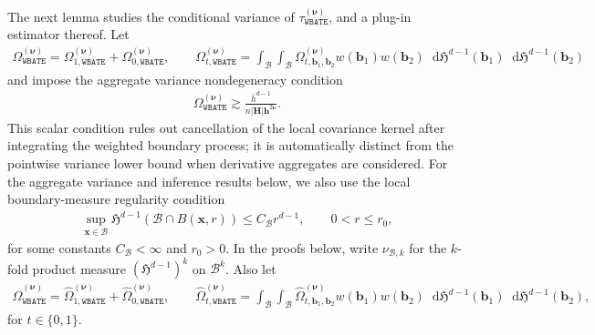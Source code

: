\documentclass[10pt]{article}
\newcommand{\Haus}{\mathfrak{H}}
\newcommand{\dif}{\mathop{}\!\mathrm{d}}
\newcommand{\bb}{\mathbf{b}}
\newcommand{\bh}{\mathbf{h}}
\newcommand{\bH}{\mathbf{H}}
\newcommand{\bx}{\mathbf{x}}
\newcommand{\bnu}{\boldsymbol{\nu}}
\newcommand{\B}{\mathcal{B}}
\begin{document}
The next lemma studies the conditional variance of $\tau_{\mathtt{WBATE}}^{(\bnu)}$, and a plug-in estimator thereof. Let
\begin{align*}
    \Omega_{\mathtt{WBATE}}^{(\bnu)} = \Omega_{1,\mathtt{WBATE}}^{(\bnu)} + \Omega_{0,\mathtt{WBATE}}^{(\bnu)},
    \qquad
    \Omega_{t,\mathtt{WBATE}}^{(\bnu)} = \int_{\B} \int_{\B} \Omega^{(\bnu)}_{t,\bb_1,\bb_2} w(\bb_1) w(\bb_2) \dif\Haus^{d-1}(\bb_1) \dif\Haus^{d-1}(\bb_2)
\end{align*}
and impose the aggregate variance nondegeneracy condition
\begin{align}
    \Omega_{\mathtt{WBATE}}^{(\bnu)}
    \gtrsim \frac{\bar{h}^{d-1}}{n|\bH|\bh^{2\bnu}}.
    \label{sa-eq: sharp WBATE aggregate nondegeneracy}
\end{align}
This scalar condition rules out cancellation of the local covariance kernel after integrating the weighted boundary process; it is automatically distinct from the pointwise variance lower bound when derivative aggregates are considered.
For the aggregate variance and inference results below, we also use the local boundary-measure regularity condition
\begin{align}
    \sup_{\bx\in\B}\Haus^{d-1}(\B\cap B(\bx,r)) \leq C_{\B}r^{d-1},
    \qquad 0<r\leq r_0,
    \label{sa-eq: local boundary measure regularity}
\end{align}
for some constants $C_{\B}<\infty$ and $r_0>0$. In the proofs below, write $\nu_{\B,k}$ for the $k$-fold product measure $(\Haus^{d-1})^k$ on $\B^k$.
Also let
\begin{align*}
    \widehat{\Omega}_{\mathtt{WBATE}}^{(\bnu)} = \widehat{\Omega}_{1,\mathtt{WBATE}}^{(\bnu)} + \widehat{\Omega}_{0,\mathtt{WBATE}}^{(\bnu)},
    \qquad
    \widehat{\Omega}_{t,\mathtt{WBATE}}^{(\bnu)} = \int_{\B} \int_{\B} \widehat{\Omega}^{(\bnu)}_{t,\bb_1, \bb_2} w(\bb_1) w(\bb_2) \dif\Haus^{d-1}(\bb_1) \dif\Haus^{d-1}(\bb_2),
\end{align*}
for $t\in\{0,1\}$.
\end{document}
